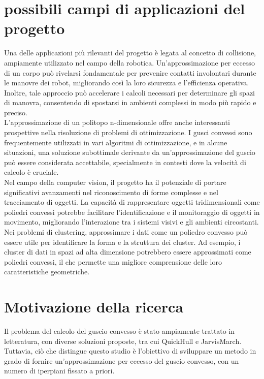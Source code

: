\section{possibili campi di applicazioni del progetto}
Una delle applicazioni più rilevanti del progetto è legata al concetto di collisione, 
ampiamente utilizzato nel campo della robotica. Un'approssimazione per eccesso di un 
corpo può rivelarsi fondamentale per prevenire contatti involontari durante le 
manovre dei robot, migliorando così la loro sicurezza e l'efficienza operativa. 
Inoltre, tale approccio può accelerare i calcoli necessari per determinare gli spazi 
di manovra, consentendo di spostarsi in ambienti complessi in modo più rapido 
e preciso.\\

L'approssimazione di un politopo n-dimensionale offre anche interessanti prospettive 
nella risoluzione di problemi di ottimizzazione. 
I gusci convessi sono frequentemente utilizzati in vari algoritmi di ottimizzazione, 
e in alcune situazioni, una soluzione subottimale derivante da un'approssimazione 
del guscio può essere considerata accettabile, specialmente in contesti dove la 
velocità di calcolo è cruciale.\\

Nel campo della computer vision, il progetto ha il potenziale di portare significativi 
avanzamenti nel riconoscimento di forme complesse e nel tracciamento di oggetti. 
La capacità di rappresentare oggetti tridimensionali come poliedri convessi potrebbe 
facilitare l'identificazione e il monitoraggio di oggetti in movimento, migliorando 
l'interazione tra i sistemi visivi e gli ambienti circostanti.\\

Nei problemi di clustering, approssimare i dati come un poliedro convesso può essere 
utile per identificare la forma e la struttura dei cluster. 
Ad esempio, i cluster di dati in spazi ad alta dimensione potrebbero essere approssimati 
come poliedri convessi, il che permette una migliore comprensione delle loro 
caratteristiche geometriche.\\

\section{Motivazione della ricerca} 
Il problema del calcolo del guscio convesso è stato ampiamente trattato in letteratura, 
con diverse soluzioni proposte, tra cui QuickHull\cite{QuickHull} e 
JarvisMarch\cite{JarvisMarch}. 
Tuttavia, ciò che distingue questo studio è l'obiettivo di sviluppare un metodo 
in grado di fornire un'approssimazione per eccesso del guscio convesso, 
con un numero di iperpiani fissato a priori.


